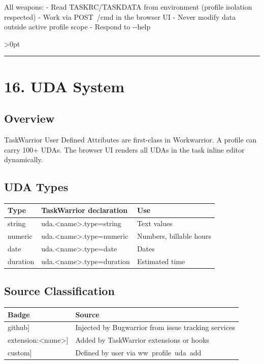 \documentclass[11pt, a4paper, DIV=14]{scrartcl}
\renewcommand{\texttt}[1]{{\ttfamily\fontsize{8.5}{10.5}\selectfont\color{BabbNavy}#1}}
\let\origRule\rule
\renewcommand{\rule}[3][0pt]{%
  \ifnum\dimexpr#3\relax>0pt
    \par\vspace{2pt}\noindent{\color{BabbBorder}\origRule[#1]{#2}{#3}}\par\vspace{2pt}%
  \else
    \origRule[#1]{#2}{#3}%
  \fi
}
\begin{document}
All weapons: - Read TASKRC/TASKDATA from environment (profile isolation
respected) - Work via \texttt{POST\ /cmd} in the browser UI - Never
modify data outside active profile scope - Respond to \texttt{-\/-help}

\begin{center}\rule{0.5\linewidth}{0.5pt}\end{center}

\section{16. UDA System}\label{uda-system}

\subsection{Overview}\label{overview-3}

TaskWarrior User Defined Attributes are first-class in Workwarrior. A
profile can carry 100+ UDAs. The browser UI renders all UDAs in the task
inline editor dynamically.

\subsection{UDA Types}\label{uda-types}

{\def\LTcaptype{none} %
\begin{longtable}[]{@{}lll@{}}
\toprule\noalign{}
Type & TaskWarrior declaration & Use \\
\midrule\noalign{}
\endhead
\bottomrule\noalign{}
\endlastfoot
string & \texttt{uda.\textless{}name\textgreater{}.type=string} & Text
values \\
numeric & \texttt{uda.\textless{}name\textgreater{}.type=numeric} &
Numbers, billable hours \\
date & \texttt{uda.\textless{}name\textgreater{}.type=date} & Dates \\
duration & \texttt{uda.\textless{}name\textgreater{}.type=duration} &
Estimated time \\
\end{longtable}
}

\subsection{Source Classification}\label{source-classification}

{\def\LTcaptype{none} %
\begin{longtable}[]{@{}ll@{}}
\toprule\noalign{}
Badge & Source \\
\midrule\noalign{}
\endhead
\bottomrule\noalign{}
\endlastfoot
\texttt{{[}github{]}} & Injected by Bugwarrior from issue tracking
services \\
\texttt{{[}extension:\textless{}name\textgreater{}{]}} & Added by
TaskWarrior extensions or hooks \\
\texttt{{[}custom{]}} & Defined by user via
\texttt{ww\ profile\ uda\ add} \\
\end{longtable}
}
\end{document}
